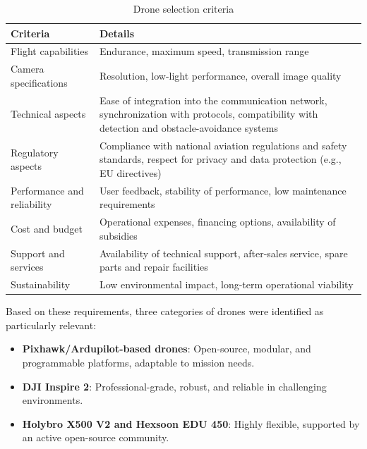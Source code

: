 \begin{table}[H]
\centering
\caption{Drone selection criteria}
\label{tab:drone_criteria}
\begin{tabular}{|p{4cm}|p{9cm}|}
\hline
\textbf{Criteria} & \textbf{Details} \\ \hline
Flight capabilities & Endurance, maximum speed, transmission range \\ \hline
Camera specifications & Resolution, low-light performance, overall image quality \\ \hline
Technical aspects & Ease of integration into the communication network, 
synchronization with protocols, compatibility with detection and obstacle-avoidance systems \\ \hline
Regulatory aspects & Compliance with national aviation regulations and safety standards, 
respect for privacy and data protection (e.g., EU directives) \\ \hline
Performance and reliability & User feedback, stability of performance, low maintenance requirements \\ \hline
Cost and budget & Operational expenses, financing options, availability of subsidies \\ \hline
Support and services & Availability of technical support, after-sales service, spare parts and repair facilities \\ \hline
Sustainability & Low environmental impact, long-term operational viability \\ \hline
\end{tabular}
\end{table}

Based on these requirements, three categories of drones were identified as particularly relevant:  
\begin{itemize}
    \item \textbf{Pixhawk/Ardupilot-based drones}: Open-source, modular, and programmable platforms, adaptable to mission needs.  
    \item \textbf{DJI Inspire 2}: Professional-grade, robust, and reliable in challenging environments.  
    \item \textbf{Holybro X500 V2 and Hexsoon EDU 450}: Highly flexible, supported by an active open-source community.  
\end{itemize}

